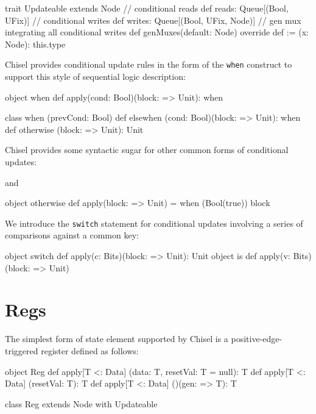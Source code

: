 \documentclass[10pt,twocolumn]{article}
\def\code#1{{\small\tt #1}}
\begin{document}
\begin{scala}
trait Updateable extends Node {
  // conditional reads
  def reads: Queue[(Bool, UFix)]
  // conditional writes
  def writes: Queue[(Bool, UFix, Node)]
  // gen mux integrating all conditional writes
  def genMuxes(default: Node)
  override def := (x: Node): this.type
}
\end{scala}

Chisel provides conditional update rules
in the form of the \code{when} construct to support this style of
sequential logic description:
 
\begin{scala}
object when {
  def apply(cond: Bool)(block: => Unit): when
}

class when (prevCond: Bool) {
  def elsewhen (cond: Bool)(block: => Unit): when
  def otherwise (block: => Unit): Unit
}
\end{scala}


Chisel provides some syntactic sugar for other common forms of
conditional updates:

\begin{scala}
object unless {
  def apply(c: Bool)(block: => Unit) = 
    when (!c) { block )
}
\end{scala}

\noindent 
and

\begin{scala}
object otherwise {
  def apply(block: => Unit) = 
    when (Bool(true)) { block }
}
\end{scala}

We introduce the \code{switch} statement for conditional updates
involving a series of comparisons against a common key:

\begin{scala}
object switch {
  def apply(c: Bits)(block: => Unit): Unit
}
object is {
  def apply(v: Bits)(block: => Unit)
}
\end{scala}

\section{Regs}

The simplest form of state element supported by Chisel is a
positive-edge-triggered register defined as follows:

\begin{scala}
object Reg {
  def apply[T <: Data]
        (data: T, resetVal: T = null): T
  def apply[T <: Data] (resetVal: T): T
  def apply[T <: Data] ()(gen: => T): T
}
 
class Reg extends Node with Updateable
\end{scala}
\end{document}
